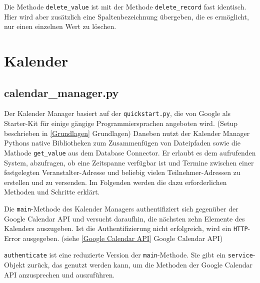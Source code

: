                 Die Methode \verb|delete_value| ist mit der Methode \verb|delete_record| fast identisch. Hier wird aber zusätzlich eine Spaltenbezeichnung übergeben, die es ermöglicht, nur einen einzelnen Wert zu löschen.


    \section{Kalender} \label{Implementierung: Kalender}
        
        \subsection{calendar\_manager.py} \label{Implementierung: calendar_manager.py}
        Der Kalender Manager basiert auf der \verb|quickstart.py|, die von Google als Starter-Kit für einige gängige Programmiersprachen angeboten wird. (Setup beschrieben in \ref{Grundlagen} Grundlagen) Daneben nutzt der Kalender Manager Pythons native Bibliotheken zum Zusammenfügen von Dateipfaden sowie die Mathode \verb|get_value| aus dem Database Connector. Er erlaubt es dem aufrufenden System, abzufragen, ob eine Zeitspanne verfügbar ist und Termine zwischen einer festgelegten Veranstalter-Adresse und beliebig vielen Teilnehmer-Adressen zu erstellen und zu versenden. Im Folgenden werden die dazu erforderlichen Methoden und Schritte erklärt. 

                Die \verb|main|-Methode des Kalender Managers authentifiziert sich gegenüber der Google Calendar API und versucht daraufhin, die nächsten zehn Elemente des Kalenders auszugeben. Ist die Authentifizierung nicht erfolgreich, wird ein \verb|HTTP|-Error ausgegeben. (siehe \ref{Google Calendar API} Google Calendar API)

                \verb|authenticate| ist eine reduzierte Version der \verb|main|-Methode. Sie gibt ein \verb|service|-Objekt zurück, das genutzt werden kann, um die Methoden der Google Calendar API anzusprechen und auszuführen. 
    
